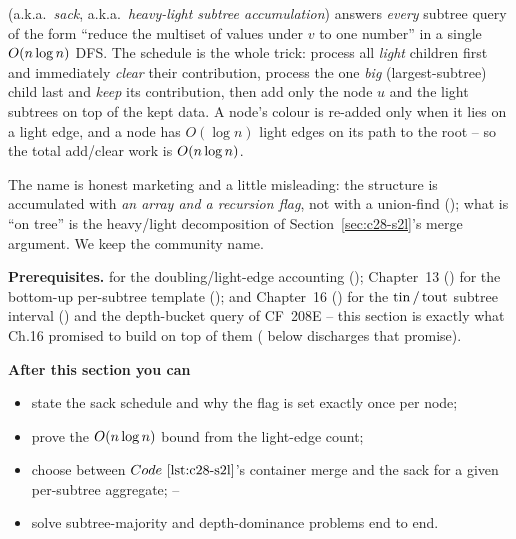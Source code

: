\begin{topicintro}
 (a.k.a.\ \emph{sack}, a.k.a.\ \emph{heavy-light subtree
accumulation}) answers \emph{every} subtree query of the form ``reduce the
multiset of values under \(v\) to one number'' in a single
\(O(n\log n)\) DFS.  The schedule is the whole trick: process all
\emph{light} children first and immediately \emph{clear} their contribution,
process the one \emph{big} (largest-subtree) child last and \emph{keep} its
contribution, then add only the node \(u\) and the light subtrees on top of the
kept data.  A node's colour is re-added only when it lies on a light edge, and
a node has \(O(\log n)\) light edges on its path to the root -- so the total
add/clear work is \(O(n\log n)\).

The name is honest marketing and a little misleading: the structure is
accumulated with \emph{an array and a recursion flag}, not with a union-find
(); what is ``on tree'' is the heavy/light decomposition of
Section~\ref{sec:c28-s2l}'s merge argument.  We keep the community name.

\textbf{Prerequisites.}  for the doubling/light-edge accounting
(); Chapter~13 () for the bottom-up per-subtree
template (); and Chapter~16 () for the
\(\operatorname{tin}/\operatorname{tout}\) subtree interval () and the depth-bucket
query of CF~208E -- this section is exactly what Ch.16 promised to build on top
of them ( below discharges that promise).

\textbf{After this section you can}
\begin{itemize}[nosep]
  \item state the sack schedule and why the  flag is set exactly once
        per node; \hfill{}
  \item prove the \(O(n\log n)\) bound from the light-edge count; \hfill{}
  \item choose between \(\coderef{c28-s2l}\)'s container merge and the sack for
        a given per-subtree aggregate; \hfill{}--
  \item solve subtree-majority and depth-dominance problems end to end.
        \hfill{}
\end{itemize}
\end{topicintro}

